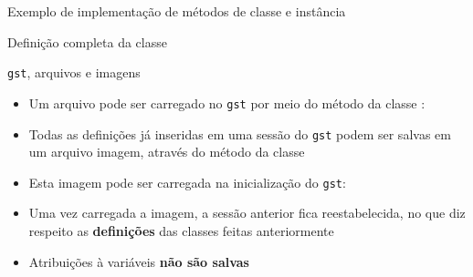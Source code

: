 \begin{frame}[fragile]{Exemplo de implementação de métodos de classe e instância}
\end{frame}

\begin{frame}[fragile]{Definição completa da classe }
\end{frame}

\begin{frame}[fragile]{{\tt gst}, arquivos e imagens}

    \begin{itemize}
        \item Um arquivo pode ser carregado no \texttt{gst} por meio do método
             da classe :


        \item Todas as definições já inseridas em uma sessão do \texttt{gst} podem ser 
            salvas em um arquivo imagem, através do método  da
            classe 


        \item Esta imagem pode ser carregada na inicialização do \texttt{gst}:


        \item Uma vez carregada a imagem, a sessão anterior fica reestabelecida, no que
            diz respeito as \textbf{definições} das classes feitas anteriormente

        \item Atribuições à variáveis \textbf{não são salvas}
    \end{itemize}

\end{frame}
